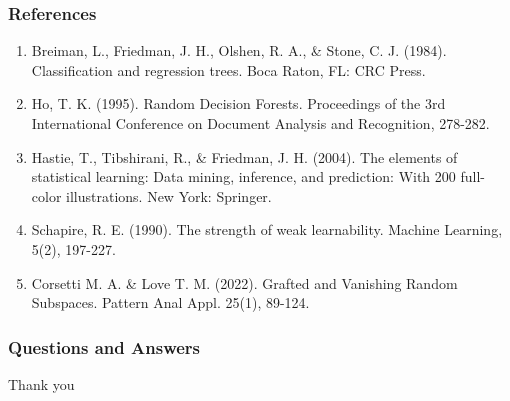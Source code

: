 \documentclass{beamer}
\begin{document}

\begin{frame}

    \frametitle{References}
    
    \scriptsize
    \begin{enumerate}
        \item Breiman, L., Friedman, J. H., Olshen, R. A., \& Stone, C. J. 
              (1984). Classification and regression trees. 
              Boca Raton, FL: CRC Press.
        \item Ho, T. K. (1995). Random Decision Forests.
              Proceedings of the 3rd International Conference on Document 
              Analysis and Recognition, 278-282.
        \item Hastie, T., Tibshirani, R., \& Friedman, J. H. (2004). 
              The elements of statistical learning: Data mining, inference, and 
              prediction: With 200 full-color illustrations. 
              New York: Springer.
        \item Schapire, R. E. (1990). The strength of weak learnability.
              Machine Learning, 5(2), 197-227.
	\item Corsetti M. A. \&  Love T. M. (2022).
Grafted and Vanishing Random Subspaces.
Pattern Anal Appl. 25(1), 89-124.
    \end{enumerate}
    
\end{frame}



\begin{frame}

    \frametitle{Questions and Answers}

    \begin{center}
        \huge
        Thank you
    \end{center}

\end{frame}
\end{document}
